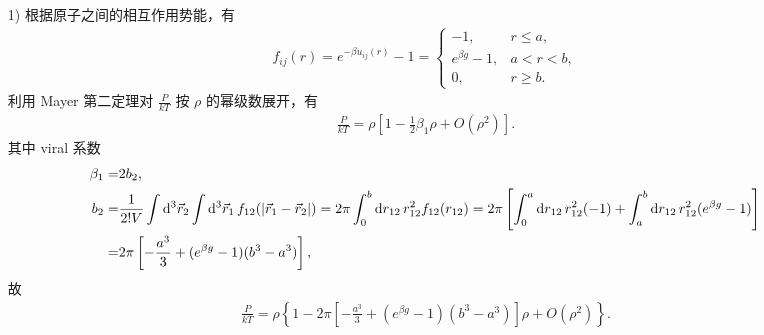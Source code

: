 \documentclass{assignment}
\begin{document}
\begin{sol}
    \begin{itemize}
        \item[1)] 根据原子之间的相互作用势能，有
        \begin{align}
            f_{ij}(r)=e^{-\beta u_{ij}(r)}-1=\left\{\begin{array}{ll}
                -1,&r\leq a,\\
                e^{\beta g}-1,&a<r<b,\\
                0,&r\geq b.
            \end{array}\right.
        \end{align}
        利用 Mayer 第二定理对 $\frac{P}{kT}$ 按 $\rho$ 的幂级数展开，有
        \begin{align}
            \frac{P}{kT}=\rho\left[1-\frac{1}{2}\beta_1\rho+O(\rho^2)\right].
        \end{align}
        其中 viral 系数
        \begin{align}
            \beta_1=&2b_2,\\
            \notag b_2=&\frac{1}{2!V}\int\mathrm{d}^3\vec{r}_2\int\mathrm{d}^3\vec{r}_1\,f_{12}(\left\lvert\vec{r}_1-\vec{r}_2\right\rvert)=2\pi\int_0^b\mathrm{d}r_{12}\,r_{12}^2f_{12}(r_{12})=2\pi\left[\int_0^a\mathrm{d}r_{12}\,r_{12}^2(-1)+\int_a^b\mathrm{d}r_{12}\,r_{12}^2(e^{\beta g}-1)\right]\\
            =&2\pi\left[-\frac{a^3}{3}+(e^{\beta g}-1)(b^3-a^3)\right],
        \end{align}
        故
        \begin{align}
            \boxed{\frac{P}{kT}=\rho\left\{1-2\pi\left[-\frac{a^3}{3}+(e^{\beta g}-1)(b^3-a^3)\right]\rho+O(\rho^2)\right\}.}
        \end{align}

\end{itemize}
\end{sol}
\end{document}
